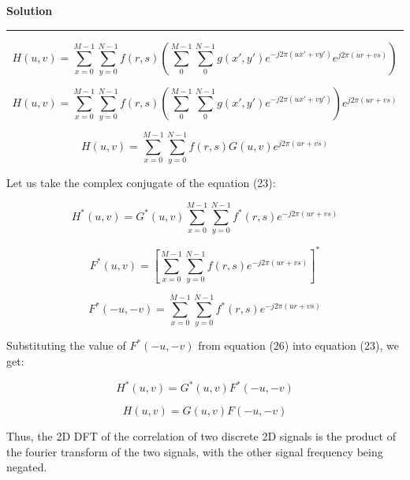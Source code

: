 \documentclass[a4paper]{article}
\newenvironment{solution}[2][]{%
    \begin{mdframed}[linecolor=green!60!black, linewidth=2pt, roundcorner=10pt, backgroundcolor=green!5!white, skipabove=12pt, skipbelow=12pt]%
        \textbf{\large #2} %
        \par\noindent\rule{\textwidth}{0.4pt} %
        \vspace{0.5em} %
}{%
    \end{mdframed}%
}
\begin{document}
\begin{solution}{Solution}
\begin{equation}
    H(u, v) = \sum_{x = 0}^{M-1} \sum_{y = 0}^{N-1} f(r, s)\left( \sum_{0}^{M-1} \sum_{0}^{N-1} g(x', y') e^{-j2\pi(ux'+vy')} e^{j2\pi(ur+vs)}\right)
\end{equation}

\begin{equation}
    H(u, v) = \sum_{x = 0}^{M-1} \sum_{y = 0}^{N-1} f(r, s)\left( \sum_{0}^{M-1} \sum_{0}^{N-1} g(x', y') e^{-j2\pi(ux'+vy')}\right) e^{j2\pi(ur+vs)}
\end{equation}

\begin{equation}
    H(u, v) = \sum_{x = 0}^{M-1} \sum_{y = 0}^{N-1} f(r, s) G(u,v) e^{j2\pi(ur+vs)}
\end{equation}


Let us take the complex conjugate of the equation (23):

\begin{equation}
    H^*(u, v) = G^*(u,v) \sum_{x = 0}^{M-1} \sum_{y = 0}^{N-1} f^*(r, s)  e^{-j2\pi(ur+vs)}
\end{equation}

\begin{equation}
    F^*(u, v) = [\sum_{x = 0}^{M-1} \sum_{y = 0}^{N-1} f(r, s)  e^{-j2\pi(ur+vs)}]^*
\end{equation}

\begin{equation}
    F^*(-u, -v) = \sum_{x = 0}^{M-1} \sum_{y = 0}^{N-1} f^*(r, s)  e^{-j2\pi(ur+vs)}
\end{equation}

Substituting the value of $F^*(-u, -v)$ from equation (26) into equation (23), we get:

\begin{equation}
    H^*(u, v) = G^*(u,v) F^*(-u, -v)
\end{equation}

\begin{equation}
    H(u, v) = G(u,v) F(-u, -v)
\end{equation}

Thus, the 2D DFT of the correlation of two discrete 2D signals is the product of the fourier transform of the two signals, with the other signal frequency being negated.

\end{solution}
\end{document}
